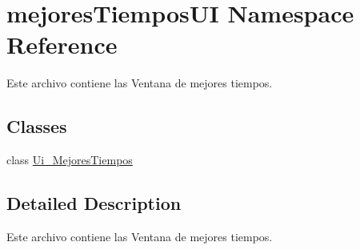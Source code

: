 \hypertarget{namespacemejores_tiempos_u_i}{\section{mejores\-Tiempos\-U\-I Namespace Reference}
\label{namespacemejores_tiempos_u_i}
}


Este archivo contiene las Ventana de mejores tiempos.  


\subsection*{Classes}
\begin{DoxyCompactItemize}
\item 
class \hyperlink{classmejores_tiempos_u_i_1_1_ui___mejores_tiempos}{Ui\-\_\-\-Mejores\-Tiempos}
\end{DoxyCompactItemize}


\subsection{Detailed Description}
Este archivo contiene las Ventana de mejores tiempos. 